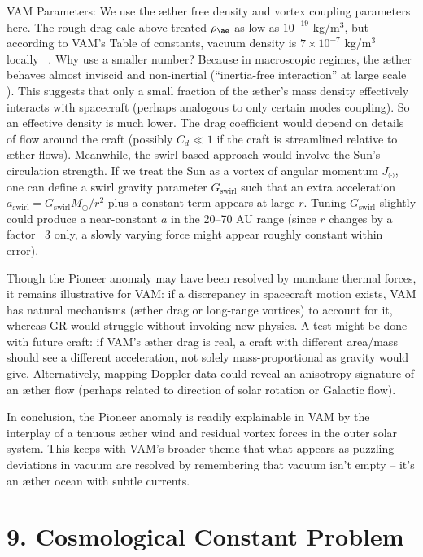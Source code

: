 \documentclass[a4paper, aps,preprint,superscriptaddress, 12pt]{revtex4}
\begin{document}
VAM Parameters: We use the æther free density and vortex coupling parameters here. The rough drag calc above treated $\rho_{\ae}$ as low as $10^{-19}$ kg/m$^3$, but according to VAM’s Table of constants, vacuum density is $7\times10^{-7}$ kg/m$^3$ locally~\cite{VAM_constants} . Why use a smaller number? Because in macroscopic regimes, the æther behaves almost inviscid and non-inertial (“inertia-free interaction” at large scale~\cite{Iskandarani2025b} ). This suggests that only a small fraction of the æther’s mass density effectively interacts with spacecraft (perhaps analogous to only certain modes coupling). So an effective density is much lower. The drag coefficient would depend on details of flow around the craft (possibly $C_d\ll1$ if the craft is streamlined relative to æther flows). Meanwhile, the swirl-based approach would involve the Sun’s circulation strength. If we treat the Sun as a vortex of angular momentum $J_\odot$, one can define a swirl gravity parameter $G_{\text{swirl}}$ such that an extra acceleration $a_{\text{swirl}} = G_{\text{swirl}} M_\odot/r^2$ plus a constant term appears at large $r$. Tuning $G_{\text{swirl}}$ slightly could produce a near-constant $a$ in the 20–70 AU range (since $r$ changes by a factor ~3 only, a slowly varying force might appear roughly constant within error).


Though the Pioneer anomaly may have been resolved by mundane thermal forces, it remains illustrative for VAM: if a discrepancy in spacecraft motion exists, VAM has natural mechanisms (æther drag or long-range vortices) to account for it, whereas GR would struggle without invoking new physics. A test might be done with future craft: if VAM’s æther drag is real, a craft with different area/mass should see a different acceleration, not solely mass-proportional as gravity would give. Alternatively, mapping Doppler data could reveal an anisotropy signature of an æther flow (perhaps related to direction of solar rotation or Galactic flow).


In conclusion, the Pioneer anomaly is readily explainable in VAM by the interplay of a tenuous æther wind and residual vortex forces in the outer solar system. This keeps with VAM’s broader theme that what appears as puzzling deviations in vacuum are resolved by remembering that vacuum isn’t empty – it’s an æther ocean with subtle currents.


\section*{9. Cosmological Constant Problem}
\end{document}
